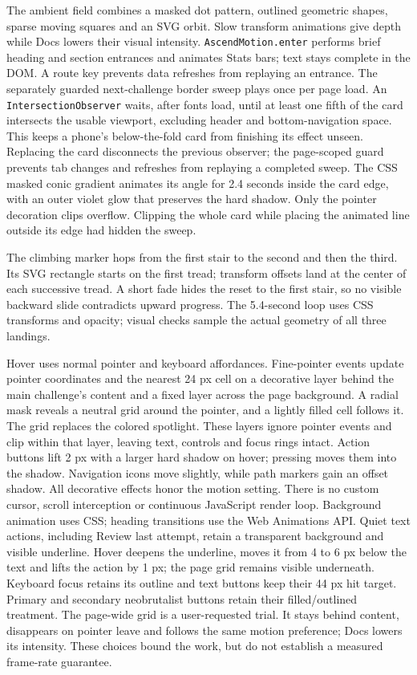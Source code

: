 The ambient field combines a masked dot pattern, outlined geometric shapes,
sparse moving squares and an SVG orbit. Slow transform animations give depth while
Docs lowers their visual intensity. \texttt{AscendMotion.enter} performs brief
heading and section entrances and animates Stats bars; text stays complete in the
DOM. A route key prevents data refreshes from replaying an entrance. The separately
guarded next-challenge border sweep plays once per page load. An
\texttt{IntersectionObserver} waits, after fonts load, until at least one fifth of the card intersects
the usable viewport, excluding header and bottom-navigation space. This keeps a
phone's below-the-fold card from finishing its effect unseen. Replacing the card
disconnects the previous observer; the page-scoped guard prevents tab changes and
refreshes from replaying a completed sweep. The CSS masked conic gradient animates
its angle for 2.4 seconds inside the card edge, with an outer violet glow that
preserves the hard shadow. Only the pointer decoration clips overflow. Clipping the
whole card while placing the animated line outside its edge had hidden the sweep.

The climbing marker hops from the first stair to the second and then the third.
Its SVG rectangle starts on the first tread; transform offsets land at the center
of each successive tread. A short fade hides the reset to the first stair, so no
visible backward slide contradicts upward progress. The 5.4-second loop uses CSS
transforms and opacity; visual checks sample the actual geometry of all three landings.

Hover uses normal pointer and keyboard affordances. Fine-pointer events update
pointer coordinates and the nearest 24 px cell on a decorative layer behind the
main challenge's content and a fixed layer across the page background. A radial mask
reveals a neutral grid around the pointer,
and a lightly filled cell follows it. The grid replaces the colored spotlight.
These layers ignore pointer events and clip within that layer, leaving text, controls and
focus rings intact. Action buttons lift 2 px with a larger hard shadow on hover;
pressing moves them into the shadow. Navigation icons move slightly, while path
markers gain an offset shadow. All decorative effects honor the motion setting. There
is no custom cursor, scroll interception or continuous JavaScript render loop.
Background animation uses CSS; heading transitions use the Web Animations API.
Quiet text actions, including Review last attempt, retain a transparent background
and visible underline. Hover deepens the underline, moves it from 4 to 6 px below
the text and lifts the action by 1 px; the page grid remains visible underneath.
Keyboard focus retains its outline and text buttons keep their 44 px hit target.
Primary and secondary neobrutalist buttons retain their filled/outlined treatment.
The page-wide grid is a user-requested trial. It stays behind content, disappears on
pointer leave and follows the same motion preference; Docs lowers its intensity.
These choices bound the work, but do not establish a measured frame-rate guarantee.

